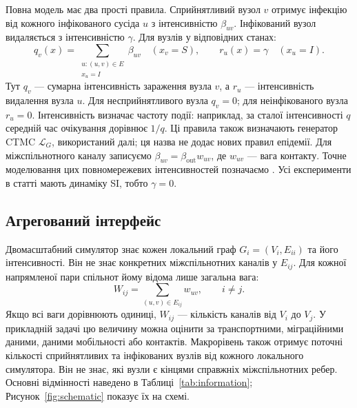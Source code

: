Повна модель має два прості правила. Сприйнятливий вузол $v$ отримує інфекцію від кожного інфікованого сусіда $u$ з інтенсивністю $\beta_{uv}$. Інфікований вузол видаляється з інтенсивністю $\gamma$. Для вузлів у відповідних станах:
\begin{equation}
\label{eq:full_generator}
q_v(x)=\sum_{\substack{u:(u,v)\in E\\x_u=I}}\beta_{uv}
\quad (x_v=S),
\qquad r_u(x)=\gamma\quad (x_u=I).
\end{equation}
Тут $q_v$ --- сумарна інтенсивність зараження вузла $v$, а $r_u$ --- інтенсивність видалення вузла $u$. Для несприйнятливого вузла $q_v=0$; для неінфікованого вузла $r_u=0$. Інтенсивність визначає частоту події: наприклад, за сталої інтенсивності $q$ середній час очікування дорівнює $1/q$. Ці правила також визначають генератор CTMC $\mathcal{L}_G$, використаний далі; ця назва не додає нових правил епідемії. Для міжспільнотного каналу записуємо $\beta_{uv}=\beta_{\mathrm{out}}w_{uv}$, де $w_{uv}$ --- вага контакту. Точне моделювання цих повномережевих інтенсивностей позначаємо \Full{}. Усі експерименти в статті мають динаміку SI, тобто $\gamma=0$.

\subsection{Агрегований інтерфейс}
\label{sec:interface}

Двомасштабний симулятор \TS{} знає кожен локальний граф $G_i=(V_i,E_{ii})$ та його інтенсивності. Він не знає конкретних міжспільнотних каналів у $E_{ij}$. Для кожної напрямленої пари спільнот йому відома лише загальна вага:
\begin{equation}
\label{eq:weight}
W_{ij}=\sum_{(u,v)\in E_{ij}}w_{uv},\qquad i\neq j.
\end{equation}
Якщо всі ваги дорівнюють одиниці, $W_{ij}$ --- кількість каналів від $V_i$ до $V_j$. У прикладній задачі цю величину можна оцінити за транспортними, міграційними даними, даними мобільності або контактів. Макрорівень також отримує поточні кількості сприйнятливих та інфікованих вузлів від кожного локального симулятора. Він не знає, які вузли є кінцями справжніх міжспільнотних ребер. Основні відмінності наведено в Таблиці~\ref{tab:information}; Рисунок~\ref{fig:schematic} показує їх на схемі.

